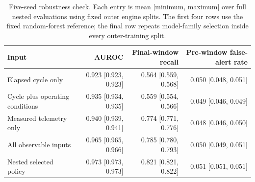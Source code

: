 \begin{table}[H]
\centering
\caption{Five-seed robustness check. Each entry is mean [minimum, maximum]
over full nested evaluations using fixed outer engine splits. The first four
rows use the fixed random-forest reference; the final row repeats model-family
selection inside every outer-training split.}
\label{tab:seed-robustness}
\small
\begin{tabular}{lrrr}
\toprule
Input & AUROC & Final-window recall & Pre-window false-alert rate \\
\midrule
Elapsed cycle only & 0.923 [0.923, 0.923] & 0.564 [0.559, 0.568] & 0.050 [0.048, 0.051] \\
Cycle plus operating conditions & 0.935 [0.934, 0.935] & 0.559 [0.554, 0.566] & 0.049 [0.046, 0.049] \\
Measured telemetry only & 0.940 [0.939, 0.941] & 0.774 [0.771, 0.776] & 0.048 [0.046, 0.050] \\
All observable inputs & 0.965 [0.965, 0.966] & 0.785 [0.780, 0.793] & 0.050 [0.049, 0.051] \\
Nested selected policy & 0.973 [0.973, 0.973] & 0.821 [0.821, 0.822] & 0.051 [0.051, 0.051] \\
\bottomrule
\end{tabular}
\end{table}

\FloatBarrier
